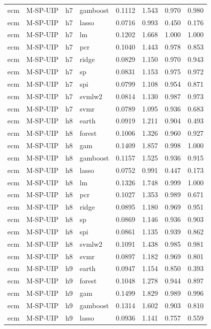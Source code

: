 \begin{ThreePartTable}
\begin{longtable}[t]{llclcccc}
ecm & M-SP-UIP & h7 & gamboost & 0.1112 & 1.543 & 0.970 & 0.980\\
ecm & M-SP-UIP & h7 & lasso & 0.0716 & 0.993 & 0.450 & 0.176\\
ecm & M-SP-UIP & h7 & lm & 0.1202 & 1.668 & 1.000 & 1.000\\
ecm & M-SP-UIP & h7 & pcr & 0.1040 & 1.443 & 0.978 & 0.853\\
ecm & M-SP-UIP & h7 & ridge & 0.0829 & 1.150 & 0.970 & 0.943\\
ecm & M-SP-UIP & h7 & sp & 0.0831 & 1.153 & 0.975 & 0.972\\
ecm & M-SP-UIP & h7 & spi & 0.0799 & 1.108 & 0.954 & 0.871\\
ecm & M-SP-UIP & h7 & svmlw2 & 0.0814 & 1.130 & 0.987 & 0.973\\
ecm & M-SP-UIP & h7 & svmr & 0.0789 & 1.095 & 0.936 & 0.683\\
\addlinespace
ecm & M-SP-UIP & h8 & earth & 0.0919 & 1.211 & 0.904 & 0.493\\
ecm & M-SP-UIP & h8 & forest & 0.1006 & 1.326 & 0.960 & 0.927\\
ecm & M-SP-UIP & h8 & gam & 0.1409 & 1.857 & 0.998 & 1.000\\
ecm & M-SP-UIP & h8 & gamboost & 0.1157 & 1.525 & 0.936 & 0.915\\
ecm & M-SP-UIP & h8 & lasso & 0.0752 & 0.991 & 0.447 & 0.173\\
ecm & M-SP-UIP & h8 & lm & 0.1326 & 1.748 & 0.999 & 1.000\\
ecm & M-SP-UIP & h8 & pcr & 0.1027 & 1.353 & 0.989 & 0.671\\
ecm & M-SP-UIP & h8 & ridge & 0.0895 & 1.180 & 0.969 & 0.951\\
ecm & M-SP-UIP & h8 & sp & 0.0869 & 1.146 & 0.936 & 0.903\\
ecm & M-SP-UIP & h8 & spi & 0.0861 & 1.135 & 0.939 & 0.862\\
ecm & M-SP-UIP & h8 & svmlw2 & 0.1091 & 1.438 & 0.985 & 0.981\\
ecm & M-SP-UIP & h8 & svmr & 0.0897 & 1.182 & 0.969 & 0.801\\
\addlinespace
ecm & M-SP-UIP & h9 & earth & 0.0947 & 1.154 & 0.850 & 0.393\\
ecm & M-SP-UIP & h9 & forest & 0.1048 & 1.278 & 0.944 & 0.897\\
ecm & M-SP-UIP & h9 & gam & 0.1499 & 1.829 & 0.989 & 0.996\\
ecm & M-SP-UIP & h9 & gamboost & 0.1314 & 1.602 & 0.903 & 0.810\\
ecm & M-SP-UIP & h9 & lasso & 0.0936 & 1.141 & 0.757 & 0.559\\

\end{longtable}
\end{ThreePartTable}
